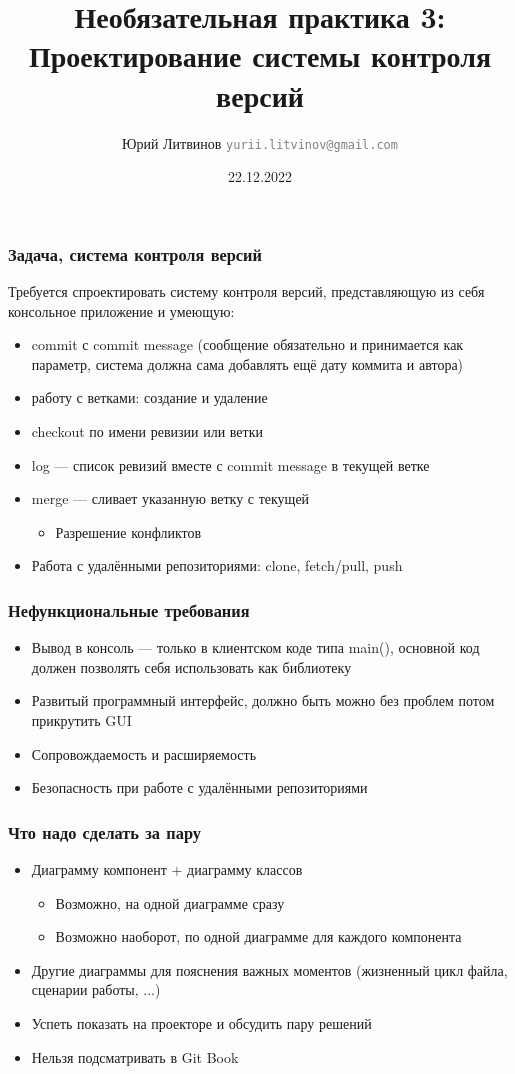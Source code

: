 \documentclass[xetex,mathserif,serif]{beamer}
\title{Необязательная практика 3: Проектирование системы контроля версий}
\author[Юрий Литвинов]{Юрий Литвинов \newline \textcolor{gray}{\small\texttt{yurii.litvinov@gmail.com}}}
\date{22.12.2022}
\begin{document}
	
	\frame{\titlepage}

	\begin{frame}
		\frametitle{Задача, система контроля версий}
		Требуется спроектировать систему контроля версий, представляющую из себя консольное приложение и умеющую:
		\begin{itemize}
			\item commit с commit message (сообщение обязательно и принимается как параметр, система должна сама добавлять ещё дату коммита и автора)
			\item работу с ветками: создание и удаление
			\item checkout по имени ревизии или ветки
			\item log --- список ревизий вместе с commit message в текущей ветке
			\item merge --- сливает указанную ветку с текущей
			\begin{itemize}
				\item Разрешение конфликтов
			\end{itemize}
			\item Работа с удалёнными репозиториями: clone, fetch/pull, push
		\end{itemize}
	\end{frame}

	\begin{frame}
		\frametitle{Нефункциональные требования}
		\begin{itemize}
			\item Вывод в консоль --- только в клиентском коде типа main(), основной код должен позволять себя использовать как библиотеку
			\item Развитый программный интерфейс, должно быть можно без проблем потом прикрутить GUI
			\item Сопровождаемость и расширяемость
			\item Безопасность при работе с удалёнными репозиториями
		\end{itemize}
	\end{frame}

	\begin{frame}
		\frametitle{Что надо сделать за пару}
		\begin{itemize}
			\item Диаграмму компонент + диаграмму классов
			\begin{itemize}
				\item Возможно, на одной диаграмме сразу
				\item Возможно наоборот, по одной диаграмме для каждого компонента
			\end{itemize}
			\item Другие диаграммы для пояснения важных моментов (жизненный цикл файла, сценарии работы, ...)
			\item Успеть показать на проекторе и обсудить пару решений
			\item Нельзя подсматривать в Git Book
		\end{itemize}
	\end{frame}
\end{document}
